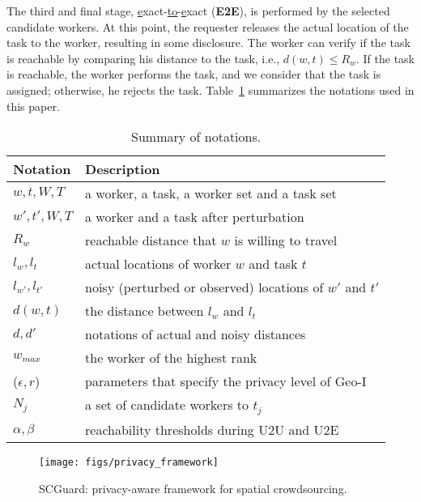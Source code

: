 \documentclass{USC-Thesis}
\newcommand{\tn}{\tabularnewline}
\numberwithin{equation}{chapter}
\begin{document}
The third and final stage, \underline{e}xact-\underline{to}-\underline{e}xact (\textbf{E2E}), is performed by the selected candidate workers. At this point, the requester releases the actual location of the task to the worker, resulting in some disclosure. The worker can verify if the task is reachable by comparing his distance to the task, i.e., $\mathit{d(w,t)\le R_w}$. If the task is reachable, the worker performs the task, and we consider that the task is assigned; otherwise, he rejects the task. Table~\ref{tab:notation2} summarizes the notations used in this paper.

\begin{table}
\begin{center}
\footnotesize
\scriptsize{
\begin{tabular}{ l | l}
\hline
\textbf{Notation} & \textbf{Description} \tn
\hline
$w, t, W, T$ &  a worker, a task, a worker set and a task set \tn
\hline
$w', t', W, T$ &  a worker and a task after perturbation \tn
\hline
$R_w$ & reachable distance that $w$ is willing to travel \tn
\hline
$l_w, l_t$ & actual locations of worker $w$ and task $t$ \tn
\hline
$l_{w'}, l_{t'}$ & noisy (perturbed or observed) locations of $w'$ and $t'$ \tn
\hline
$d(w,t)$ & the distance between $l_w$ and $l_t$ \tn
\hline
$d, d'$ & notations of actual and noisy distances \tn
\hline
$w_{max}$ & the worker of the highest rank \tn
\hline
($\epsilon, r$) & parameters that specify the privacy level of Geo-I \tn
\hline
$N_j$ & a set of candidate workers to $t_j$ \tn
\hline
$\alpha, \beta$ & reachability thresholds during U2U and U2E\tn
\hline
\end{tabular}}
\caption{Summary of notations.}\label{tab:notation2}
\end{center}
\end{table}

\begin{figure}[ht]
		\centering
\texttt{[image: figs/privacy\_framework]}
	\caption{SCGuard: privacy-aware framework for spatial crowdsourcing.}
	\label{fig:privacy_framework}
\end{figure}
\end{document}
